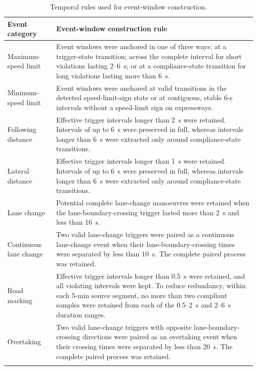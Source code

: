 \documentclass[pdflatex,sn-mathphys-num]{sn-jnl}
\begin{document}
\begin{table}[htbp]
\caption{Temporal rules used for event-window construction.}
\label{tab:event-window-parameters}
\small
\begin{tabular}{@{}p{}p{}@{}}
\toprule
Event category & Event-window construction rule \\
\midrule
Maximum-speed limit & Event windows were anchored in one of three ways: at a trigger-state transition; across the complete interval for short violations lasting 2--6~s; or at a compliance-state transition for long violations lasting more than 6~s. \\
Minimum-speed limit & Event windows were anchored at valid transitions in the detected speed-limit-sign state or at contiguous, stable 6-s intervals without a speed-limit sign on expressways. \\
Following distance & Effective trigger intervals longer than 2~s were retained. Intervals of up to 6~s were preserved in full, whereas intervals longer than 6~s were extracted only around compliance-state transitions. \\
Lateral distance & Effective trigger intervals longer than 1~s were retained. Intervals of up to 6~s were preserved in full, whereas intervals longer than 6~s were extracted only around compliance-state transitions. \\
Lane change & Potential complete lane-change manoeuvres were retained when the lane-boundary-crossing trigger lasted more than 2~s and less than 16~s. \\
Continuous lane change & Two valid lane-change triggers were paired as a continuous lane-change event when their lane-boundary-crossing times were separated by less than 10~s. The complete paired process was retained. \\
Road marking & Effective trigger intervals longer than 0.5~s were retained, and all violating intervals were kept. To reduce redundancy, within each 5-min source segment, no more than two compliant samples were retained from each of the 0.5--2~s and 2--6~s duration ranges. \\
Overtaking & Two valid lane-change triggers with opposite lane-boundary-crossing directions were paired as an overtaking event when their crossing times were separated by less than 20~s. The complete paired process was retained. \\
\botrule
\end{tabular}
\end{table}
\end{document}
